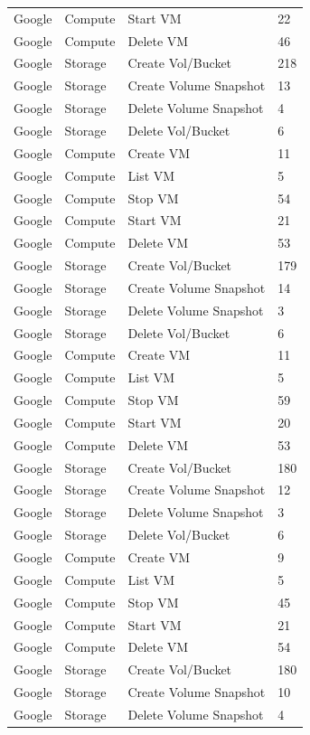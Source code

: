 \begin{table}[htb]
\begin{tabular} {p{3cm}|p{3cm}|p{5cm}|p{3cm}}
Google & Compute & Start VM & 22  \\
Google & Compute & Delete VM & 46  \\
Google & Storage & Create Vol/Bucket & 218  \\
Google & Storage & Create Volume Snapshot & 13  \\
Google & Storage & Delete Volume Snapshot & 4  \\
Google & Storage & Delete Vol/Bucket & 6  \\
Google & Compute & Create VM & 11  \\
Google & Compute & List VM & 5  \\
Google & Compute & Stop VM & 54  \\
Google & Compute & Start VM & 21  \\
Google & Compute & Delete VM & 53  \\
Google & Storage & Create Vol/Bucket & 179  \\
Google & Storage & Create Volume Snapshot & 14  \\
Google & Storage & Delete Volume Snapshot & 3  \\
Google & Storage & Delete Vol/Bucket & 6  \\
Google & Compute & Create VM & 11  \\
Google & Compute & List VM & 5  \\
Google & Compute & Stop VM & 59  \\
Google & Compute & Start VM & 20  \\
Google & Compute & Delete VM & 53  \\
Google & Storage & Create Vol/Bucket & 180  \\
Google & Storage & Create Volume Snapshot & 12  \\
Google & Storage & Delete Volume Snapshot & 3  \\
Google & Storage & Delete Vol/Bucket & 6  \\
Google & Compute & Create VM & 9  \\
Google & Compute & List VM & 5  \\
Google & Compute & Stop VM & 45  \\
Google & Compute & Start VM & 21  \\
Google & Compute & Delete VM & 54  \\
Google & Storage & Create Vol/Bucket & 180  \\
Google & Storage & Create Volume Snapshot & 10  \\
Google & Storage & Delete Volume Snapshot & 4  \\

\end{tabular}
\end{table}
